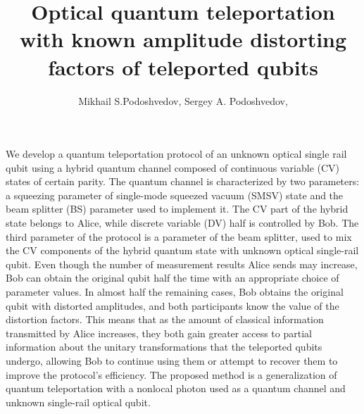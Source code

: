 \documentclass{optica-article}
\begin{document}
\title{Optical quantum teleportation with known amplitude distorting factors of teleported qubits}

\author{Mikhail S.Podoshvedov, Sergey A. Podoshvedov,}

\address{Laboratory of quantum information processing and quantum computing, South Ural State University (SUSU), Lenin Av. 76, Chelyabinsk, Russia\\
Laboratory of quantum engineering of light, South Ural State University (SUSU), Lenin Av. 76, Chelyabinsk, Russia}


\begin{abstract*} 
We develop a quantum teleportation protocol of an unknown optical single rail qubit using a hybrid quantum channel composed of continuous variable (CV) states of certain parity. The quantum channel is characterized by two parameters: a squeezing parameter of single-mode squeezed vacuum (SMSV) state and the beam splitter (BS) parameter used to implement it. The CV part of the hybrid state belongs to Alice, while discrete variable (DV) half is controlled by Bob. The third parameter of the protocol is a parameter of the beam splitter, used to mix the CV components of the hybrid quantum state with unknown optical single-rail qubit. Even though the number of measurement results Alice sends may increase, Bob can obtain the original qubit half the time with an appropriate choice of parameter values. In almost half the remaining cases, Bob obtains the original qubit with distorted amplitudes, and both participants know the value of the distortion factors. This means that as the amount of classical information transmitted by Alice increases, they both gain greater access to partial information about the unitary transformations that the teleported qubits undergo, allowing Bob to continue using them or attempt to recover them to improve the protocol's efficiency. The proposed method is a generalization of quantum teleportation with a nonlocal photon used as a quantum channel and unknown single-rail optical qubit.     

\end{abstract*}
\end{document}
